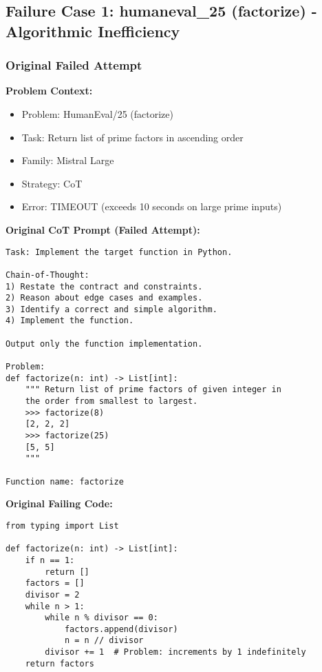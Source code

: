 \documentclass[11pt]{article}
\begin{document}
\subsection{Failure Case 1: humaneval\_25 (factorize) - Algorithmic Inefficiency}

\subsubsection{Original Failed Attempt}

\textbf{Problem Context:}
\begin{itemize}
    \item Problem: HumanEval/25 (factorize)
    \item Task: Return list of prime factors in ascending order
    \item Family: Mistral Large
    \item Strategy: CoT
    \item Error: TIMEOUT (exceeds 10 seconds on large prime inputs)
\end{itemize}

\textbf{Original CoT Prompt (Failed Attempt):}
\begin{lstlisting}
Task: Implement the target function in Python.

Chain-of-Thought:
1) Restate the contract and constraints.
2) Reason about edge cases and examples.
3) Identify a correct and simple algorithm.
4) Implement the function.

Output only the function implementation.

Problem:
def factorize(n: int) -> List[int]:
    """ Return list of prime factors of given integer in 
    the order from smallest to largest.
    >>> factorize(8)
    [2, 2, 2]
    >>> factorize(25)
    [5, 5]
    """

Function name: factorize
\end{lstlisting}

\textbf{Original Failing Code:}
\begin{lstlisting}
from typing import List

def factorize(n: int) -> List[int]:
    if n == 1:
        return []
    factors = []
    divisor = 2
    while n > 1:
        while n % divisor == 0:
            factors.append(divisor)
            n = n // divisor
        divisor += 1  # Problem: increments by 1 indefinitely
    return factors
\end{lstlisting}
\end{document}

